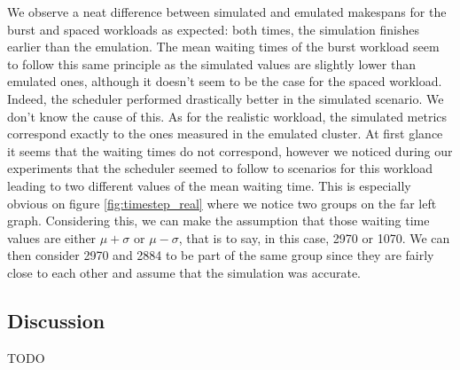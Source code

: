 We observe a neat difference between simulated and emulated makespans for the
burst and spaced workloads as expected: both times, the simulation finishes
earlier than the emulation. The mean waiting times of the burst workload seem
to follow this same principle as the simulated values are slightly lower than
emulated ones, although it doesn't seem to be the case for the spaced workload.
Indeed, the scheduler performed drastically better in the simulated scenario.
We don't know the cause of this. As for the realistic workload, the simulated
metrics correspond exactly to the ones measured in the emulated cluster. At
first glance it seems that the waiting times do not correspond, however we
noticed during our experiments that the scheduler seemed to follow to scenarios
for this workload leading to two different values of the mean waiting time.
This is especially obvious on figure \ref{fig:timestep_real} where we notice
two groups on the far left graph. Considering this, we can make the assumption
that those waiting time values are either $\mu + \sigma$ or $\mu - \sigma$,
that is to say, in this case, 2970 or 1070. We can then consider 2970 and 2884
to be part of the same group since they are fairly close to each other and
assume that the simulation was accurate.

\subsection{Discussion}

TODO
